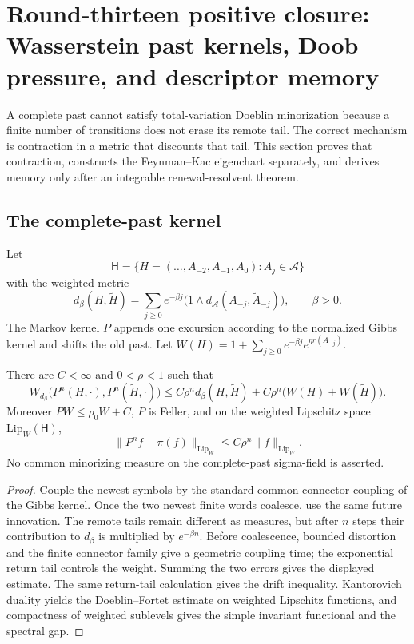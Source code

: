 \section{Round-thirteen positive closure: Wasserstein past kernels, Doob pressure, and descriptor memory}
\label{sec:r13-a4}

A complete past cannot satisfy total-variation Doeblin minorization because a
finite number of transitions does not erase its remote tail.  The correct
mechanism is contraction in a metric that discounts that tail.  This section
proves that contraction, constructs the Feynman--Kac eigenchart separately,
and derives memory only after an integrable renewal-resolvent theorem.

\subsection{The complete-past kernel}

Let
\[
 \mathsf H=\bigl\{H=(\ldots,A_{-2},A_{-1},A_0):
               A_j\in\mathcal A\bigr\}
\]
with the weighted metric
\[
 d_\beta(H,\widetilde H)
 =\sum_{j\ge0}e^{-\beta j}
   \bigl(1\wedge d_{\mathcal A}(A_{-j},\widetilde A_{-j})\bigr),
 \qquad \beta>0.
\]
The Markov kernel $P$ appends one excursion according to the normalized Gibbs
kernel and shifts the old past.  Let
$W(H)=1+\sum_{j\ge0}e^{-\beta j}e^{\eta r(A_{-j})}$.

\begin{theorem}
\label{thm:r13-a4-wasserstein}
There are $C<\infty$ and $0<\rho<1$ such that
\[
 W_{d_\beta}\bigl(P^n(H,\cdot),P^n(\widetilde H,\cdot)\bigr)
 \le C\rho^n d_\beta(H,\widetilde H)
      +C\rho^n\bigl(W(H)+W(\widetilde H)\bigr).
\]
Moreover $PW\le\rho_0W+C$, $P$ is Feller, and on the weighted Lipschitz space
$\mathrm{Lip}_W(\mathsf H)$,
\[
 \|P^nf-\pi(f)\|_{\mathrm{Lip}_W}
 \le C\rho^n\|f\|_{\mathrm{Lip}_W}.
\]
No common minorizing measure on the complete-past sigma-field is asserted.
\end{theorem}

\begin{proof}
Couple the newest symbols by the standard common-connector coupling of the
Gibbs kernel.  Once the two newest finite words coalesce, use the same future
innovation.  The remote tails remain different as measures, but after $n$
steps their contribution to $d_\beta$ is multiplied by $e^{-\beta n}$.
Before coalescence, bounded distortion and the finite connector family give a
geometric coupling time; the exponential return tail controls the weight.
Summing the two errors gives the displayed estimate.  The same return-tail
calculation gives the drift inequality.  Kantorovich duality yields the
Doeblin--Fortet estimate on weighted Lipschitz functions, and compactness of
weighted sublevels gives the simple invariant functional and the spectral
gap.
\end{proof}

